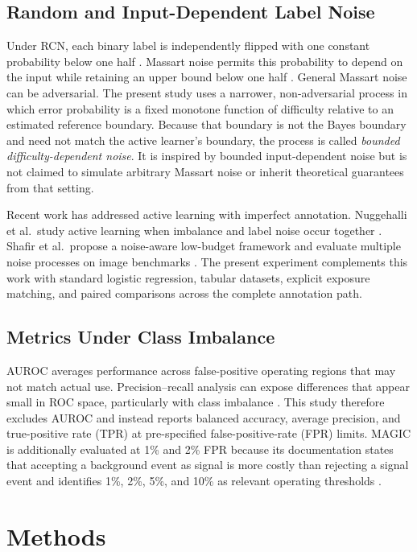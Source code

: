 \documentclass[11pt]{article}
\begin{document}
\subsection{Random and Input-Dependent Label Noise}

Under RCN, each binary label is independently flipped with one constant
probability below one half \citep{angluin1988}. Massart noise permits this
probability to depend on the input while retaining an upper bound below one
half \citep{massart2006,awasthi2015}. General Massart noise can be adversarial.
The present study uses a narrower, non-adversarial process in which error
probability is a fixed monotone function of difficulty relative to an
estimated reference boundary. Because that boundary is not the Bayes boundary
and need not match the active learner's boundary, the process is called
\emph{bounded difficulty-dependent noise}. It is inspired by bounded
input-dependent noise but is not claimed to simulate arbitrary Massart noise
or inherit theoretical guarantees from that setting.

Recent work has addressed active learning with imperfect annotation.
Nuggehalli et al.\ study active learning when imbalance and label noise occur
together \citep{nuggehalli2025}. Shafir et al.\ propose a noise-aware
low-budget framework and evaluate multiple noise processes on image
benchmarks \citep{shafir2025}. The present experiment complements this work
with standard logistic regression, tabular datasets, explicit exposure
matching, and paired comparisons across the complete annotation path.

\subsection{Metrics Under Class Imbalance}

AUROC averages performance across false-positive operating regions that may
not match actual use. Precision--recall analysis can expose differences that
appear small in ROC space, particularly with class imbalance
\citep{davis2006,saito2015}. This study therefore excludes AUROC and instead
reports balanced accuracy, average precision, and true-positive rate (TPR) at
pre-specified false-positive-rate (FPR) limits. MAGIC is additionally
evaluated at 1\% and 2\% FPR because its documentation states that accepting a
background event as signal is more costly than rejecting a signal event and
identifies 1\%, 2\%, 5\%, and 10\% as relevant operating thresholds
\citep{bock2004}.

\section{Methods}
\end{document}
